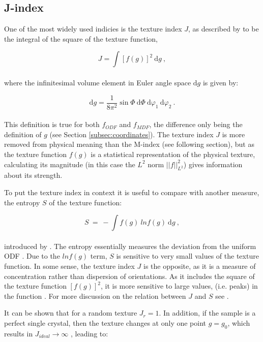 \documentclass[a4paper,12pt,twoside]{report}
\numberwithin{equation}{chapter}
\begin{document}
\subsection{J-index} \label{subsec:j-index}
 One of the most widely used indicies is the texture index $J$, as described by \cite{bunge1982texture} to be the integral of the square of the texture function,

\begin{equation}
J = \int [ f(g) ]^2\ \mathrm{d}g \ ,
\end{equation} 
\\
where the infinitesimal volume element in Euler angle space $\mathrm{d}g$ is given by:

\begin{equation}
\mathrm{d}g = \frac{1}{8\pi^2} \sin\Phi\ \mathrm{d}\Phi\ \mathrm{d}\varphi_1\ \mathrm{d}\varphi_2\ .
\end{equation} 
\\
This definition is true for both $f_{ODF}$ and $f_{MDF}$, the difference only being the definition of $g$ (see Section \ref{subsec:coordinates}). The texture index $J$ is more removed from physical meaning than the M-index (see following section), but as the texture function $f(g)$ is a statistical representation of the physical texture, calculating its magnitude (in this case the $L^2$ norm $||f||^2_{L^2}$) gives information about its strength.

To put the texture index in context it is useful to compare with another measure, the entropy $S$ of the texture function:

\begin{equation}
S\ =\ -\int f(g)\ ln f(g)\ \mathrm{d}g\ ,
\end{equation}
\\
introduced by \cite{Schaeben1988}. The entropy essentially measures the deviation from the uniform ODF \citep[lack of \lq{}organisation\rq{} of orientations,][]{Hielscher2007}. Due to the $ln f(g)$ term, $S$ is sensitive to very small values of the texture function. In some sense, the texture index $J$ is the opposite, as it is a measure of concentration rather than dispersion of orientations. As it includes the square of the texture function $[f(g)]^2$, it is more sensitive to large values, (i.e. peaks) in the function \citep{Mainprice}. For more discussion on the relation between $J$ and $S$ see \cite{Hielscher2007}. 

It can be shown that for a random texture $J_r = 1$. In addition, if the sample is a perfect single crystal, then the texture changes at only one point $g = g_0$, which results in $J_{ideal} \to \infty$ \citep{bunge1982texture}, leading to:
\end{document}
